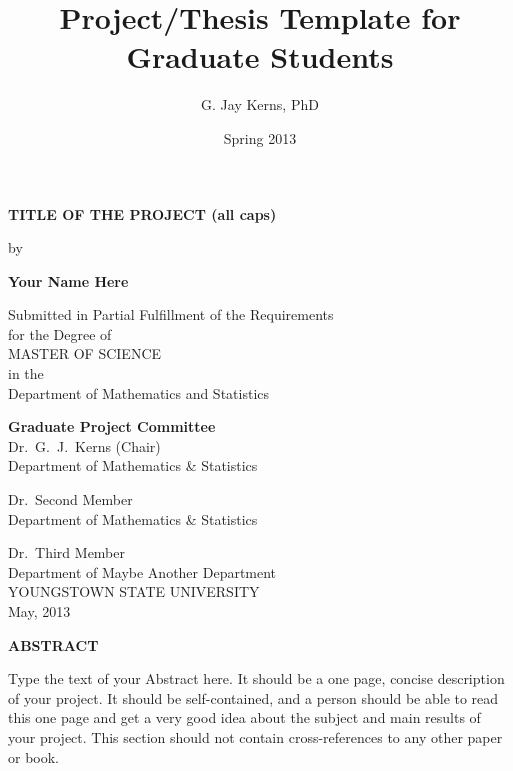 \documentclass[11pt]{article}
\author{G. Jay Kerns, PhD}
\date{Spring 2013}
\title{Project/Thesis Template for Graduate Students}
\renewcommand{\maketitle}{}
\begin{document}
\maketitle
\newpage
\begin{center}
\textbf{TITLE OF THE PROJECT (all caps)} 

\vspace{0.25in}
by 
\vspace{0.25in}

\textbf{Your Name Here}

\vspace{1in}

Submitted in Partial Fulfillment of the Requirements\\
for the Degree of\\
\vspace{0.1in}
MASTER OF SCIENCE\\
\vspace{0.1in}
in the\\
Department of Mathematics and Statistics\\

\vspace{1in}

\textbf{Graduate Project Committee}\\
\bigskip
Dr.\ G.\ J.\ Kerns (Chair)\\
Department of Mathematics \& Statistics\\
\bigskip

Dr.\ Second Member\\
Department of Mathematics \& Statistics\\
\bigskip

Dr.\ Third Member \\
Department of Maybe Another Department\\

\vfill
YOUNGSTOWN STATE UNIVERSITY\\
May, 2013 
\end{center}

\newpage
\begin{center}
\textbf{ABSTRACT} 
\end{center} \vspace{0.25in}

Type the text of your Abstract here.  It should be a one page, 
concise description of your project. It should be self-contained, 
and a person should be able to read this one page and get a very 
good idea about the subject and main results of your project. 
This section should not contain cross-references to any other 
paper or book. 
\end{document}
